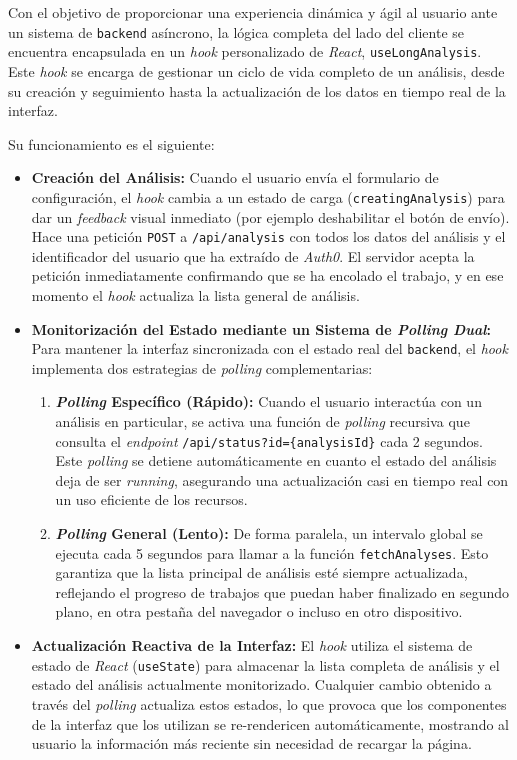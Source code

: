 Con el objetivo de proporcionar una experiencia dinámica y ágil al usuario ante un sistema de \texttt{backend} asíncrono, la lógica completa del lado del cliente se encuentra encapsulada en un \textit{hook} personalizado de \textit{React}, \texttt{useLongAnalysis}. Este \textit{hook} se encarga de gestionar un ciclo de vida completo de un análisis, desde su creación y seguimiento hasta la actualización de los datos en tiempo real de la interfaz.

Su funcionamiento es el siguiente:

\begin{itemize}
    \item \textbf{Creación del Análisis:} Cuando el usuario envía el formulario de configuración, el \textit{hook} cambia a un estado de carga (\texttt{creatingAnalysis}) para dar un \textit{feedback} visual inmediato (por ejemplo deshabilitar el botón de envío). Hace una petición \texttt{POST} a \texttt{/api/analysis} con todos los datos del análisis y el identificador del usuario que ha extraído de \textit{Auth0}. El servidor acepta la petición inmediatamente confirmando que se ha encolado el trabajo, y en ese momento el \textit{hook} actualiza la lista general de análisis.
    \item \textbf{Monitorización del Estado mediante un Sistema de \textit{Polling Dual}:} Para mantener la interfaz sincronizada con el estado real del \texttt{backend}, el \textit{hook} implementa dos estrategias de \textit{polling} complementarias:
    \begin{enumerate}
        \item \textbf{\textit{Polling} Específico (Rápido):} Cuando el usuario interactúa con un análisis en particular, se activa una función de \textit{polling} recursiva que consulta el \textit{endpoint} \texttt{/api/status?id=\{analysisId\}} cada 2 segundos. Este \textit{polling} se detiene automáticamente en cuanto el estado del análisis deja de ser \textit{running}, asegurando una actualización casi en tiempo real con un uso eficiente de los recursos.
        \item \textbf{\textit{Polling} General (Lento):} De forma paralela, un intervalo global se ejecuta cada 5 segundos para llamar a la función \texttt{fetchAnalyses}. Esto garantiza que la lista principal de análisis esté siempre actualizada, reflejando el progreso de trabajos que puedan haber finalizado en segundo plano, en otra pestaña del navegador o incluso en otro dispositivo.
    \end{enumerate}
    \item \textbf{Actualización Reactiva de la Interfaz:} El \textit{hook} utiliza el sistema de estado de \textit{React} (\texttt{useState}) para almacenar la lista completa de análisis y el estado del análisis actualmente monitorizado. Cualquier cambio obtenido a través del \textit{polling} actualiza estos estados, lo que provoca que los componentes de la interfaz que los utilizan se re-rendericen automáticamente, mostrando al usuario la información más reciente sin necesidad de recargar la página.
    

\end{itemize}
